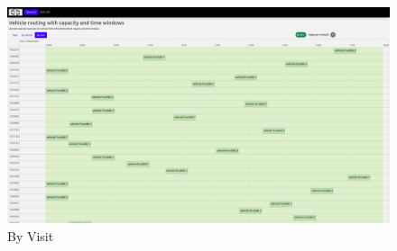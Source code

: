 \documentclass[a4paper,12pt, final]{article}
\begin{document}
\begin{figure}[htbp]
    \centering
    \includegraphics[width=\textwidth]{gfx/VRP_5.png}
    \caption{By Visit}
    \label{fig:VRP_5}
\end{figure}
\end{document}
